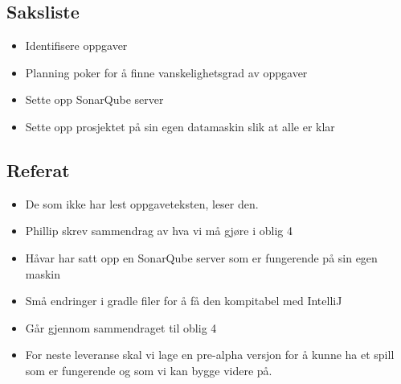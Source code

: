 \documentclass[11pt]{meetingmins}
\begin{document}
\maketitle
\subsection{Saksliste}

\begin{itemize}
\item Identifisere oppgaver
\item Planning poker for {\aa} finne vanskelighetsgrad av oppgaver
\item Sette opp SonarQube server
\item Sette opp prosjektet p{\aa} sin egen datamaskin slik at alle er klar
\end{itemize}

\subsection{Referat}

\begin{itemize}
\item De som ikke har lest oppgaveteksten, leser den.
\item Phillip skrev sammendrag av hva vi m{\aa} gj{\o}re i oblig 4
\item H{\aa}var har satt opp en SonarQube server som er fungerende på sin egen maskin
\item Sm{\aa} endringer i gradle filer for {\aa} f{\aa} den kompitabel med IntelliJ
\item G{\aa}r gjennom sammendraget til oblig 4
\item For neste leveranse skal vi lage en {\textquotedbl}pre-alpha{\textquotedbl} versjon for {\aa} kunne ha et spill
som er fungerende og som vi kan bygge videre p{\aa}.
\end{itemize}
\end{document}
